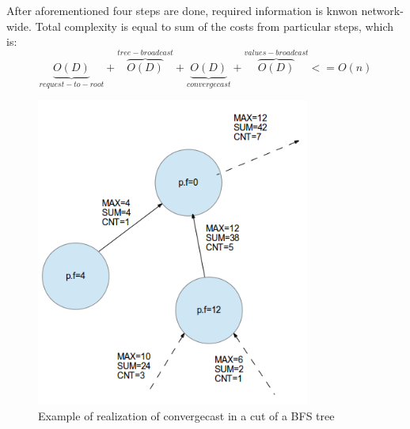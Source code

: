 \documentclass[paper=a4, fontsize=11pt]{scrartcl} %
\numberwithin{equation}{section} %
\numberwithin{figure}{section} %
\numberwithin{table}{section} %
\begin{document}
After aforementioned four steps are done, required information is knwon network-wide. Total complexity is equal to sum of the costs from particular steps, which is:
\begin{equation}
\underbrace{O(D)}_{request-to-root} + \overbrace{O(D)}^{tree-broadcast} + \underbrace{O(D)}_{convergecast} + \overbrace{O(D)}^{values-broadcast} <= O(n)
\end{equation}
\begin{figure}[ht!]
\centering
\includegraphics[width=90mm]{q3_1.png}
\caption{Example of realization of convergecast in a cut of a BFS tree}
\label{q3_1}
\end{figure}
\end{document}
